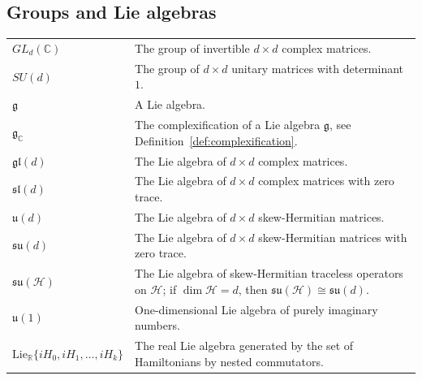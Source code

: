 \documentclass[11pt,letterpaper]{article}
\newcounter{alg}
\theoremstyle{plain}
\theoremstyle{plain}
\theoremstyle{plain}
\theoremstyle{plain}
\theoremstyle{plain}
\theoremstyle{plain}
\newcommand{\C}{\mathbb{C}}
\newcommand{\R}{\mathbb{R}}
\newcommand{\Lie}{\mathrm{Lie}}
\theoremstyle{plain}
\theoremstyle{definition}
\theoremstyle{plain}
\begin{document}
\subsection*{Groups and Lie algebras}

\begin{tabular}{@{}ll@{}}

\parbox[t]{0.22\textwidth}{$GL_d(\mathbb{C})$} & \parbox[t]{0.72\textwidth}{The group of invertible $d \times d$ complex matrices.} \\[0.6em]

\parbox[t]{0.22\textwidth}{$SU(d)$} & \parbox[t]{0.72\textwidth}{The group of $d \times d$ unitary matrices with determinant $1$.} \\[0.6em]

\parbox[t]{0.22\textwidth}{$\mathfrak{g}$} & \parbox[t]{0.72\textwidth}{A Lie algebra.} \\[0.6em]

\parbox[t]{0.22\textwidth}{$\mathfrak{g}_\C$} & \parbox[t]{0.72\textwidth}{The complexification of a Lie algebra $\mathfrak{g}$, see Definition~\ref{def:complexification}.} \\[0.6em]

\parbox[t]{0.22\textwidth}{$\mathfrak{gl}(d)$} & \parbox[t]{0.72\textwidth}{The Lie algebra of $d \times d$ complex matrices.} \\[0.6em]

\parbox[t]{0.22\textwidth}{$\mathfrak{sl}(d)$} & \parbox[t]{0.72\textwidth}{The Lie algebra of $d \times d$ complex matrices with zero trace.} \\[0.6em]

\parbox[t]{0.22\textwidth}{$\mathfrak{u}(d)$} & \parbox[t]{0.72\textwidth}{The Lie algebra of $d \times d$ skew-Hermitian matrices.} \\[0.6em]

\parbox[t]{0.22\textwidth}{$\mathfrak{su}(d)$} & \parbox[t]{0.72\textwidth}{The Lie algebra of $d \times d$ skew-Hermitian matrices with zero trace.} \\[0.6em]

\parbox[t]{0.22\textwidth}{$\mathfrak{su}(\mathcal{H})$} & \parbox[t]{0.72\textwidth}{The Lie algebra of skew-Hermitian traceless operators on \(\mathcal H\); if \(\dim\mathcal H=d\), then \(\mathfrak{su}(\mathcal H)\cong\mathfrak{su}(d)\).} \\[0.6em]

\parbox[t]{0.22\textwidth}{$\mathfrak{u}(1)$} & \parbox[t]{0.72\textwidth}{One-dimensional Lie algebra of purely imaginary numbers.} \\[0.6em]

\parbox[t]{0.22\textwidth}{$\Lie_{\R}\{i H_0, i H_1, \ldots, i H_k\}$} & \parbox[t]{0.72\textwidth}{The real Lie algebra generated by the set of Hamiltonians by nested commutators.} \\[0.6em]

\end{tabular}
\end{document}
